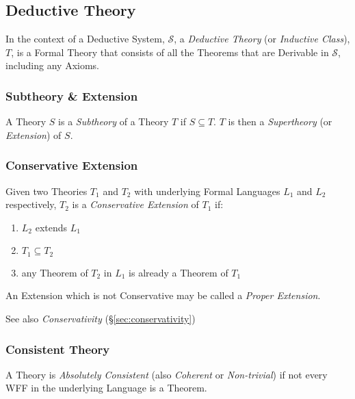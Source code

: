\subsection{Deductive Theory}\label{sec:deductive_theory}

In the context of a Deductive System, $\mathcal{S}$, a \emph{Deductive
  Theory} (or \emph{Inductive Class}), $T$, is a Formal Theory that
consists of all the Theorems that are Derivable in $\mathcal{S}$,
including any Axioms.



\subsubsection{Subtheory \& Extension}\label{sec:subtheory}

A Theory $S$ is a \emph{Subtheory} of a Theory $T$ if $S \subseteq T$.
$T$ is then a \emph{Supertheory} (or \emph{Extension}) of $S$.



\subsubsection{Conservative Extension}\label{sec:conservative_extension}

Given two Theories $T_1$ and $T_2$ with underlying Formal Languages
$L_1$ and $L_2$ respectively, $T_2$ is a \emph{Conservative Extension}
of $T_1$ if:
\begin{enumerate}
    \item $L_2$ extends $L_1$
    \item $T_1 \subseteq T_2$
    \item any Theorem of $T_2$ in $L_1$ is already a Theorem of $T_1$
\end{enumerate}
An Extension which is not Conservative may be called a \emph{Proper
  Extension}.

See also \emph{Conservativity} (\S\ref{sec:conservativity})



\subsubsection{Consistent Theory}\label{sec:consistent_theory}

A Theory is \emph{Absolutely Consistent} (also \emph{Coherent} or
\emph{Non-trivial}) if not every WFF in the underlying Language is a
Theorem.

